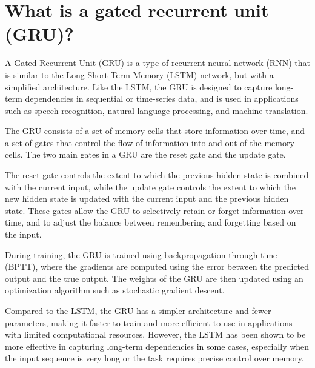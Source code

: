 \section{What is a gated recurrent unit (GRU)?}
A Gated Recurrent Unit (GRU) is a type of recurrent neural network (RNN) that is similar to the Long Short-Term Memory (LSTM) network, but with a simplified architecture. Like the LSTM, the GRU is designed to capture long-term dependencies in sequential or time-series data, and is used in applications such as speech recognition, natural language processing, and machine translation.

The GRU consists of a set of memory cells that store information over time, and a set of gates that control the flow of information into and out of the memory cells. The two main gates in a GRU are the reset gate and the update gate.

The reset gate controls the extent to which the previous hidden state is combined with the current input, while the update gate controls the extent to which the new hidden state is updated with the current input and the previous hidden state. These gates allow the GRU to selectively retain or forget information over time, and to adjust the balance between remembering and forgetting based on the input.

During training, the GRU is trained using backpropagation through time (BPTT), where the gradients are computed using the error between the predicted output and the true output. The weights of the GRU are then updated using an optimization algorithm such as stochastic gradient descent.

Compared to the LSTM, the GRU has a simpler architecture and fewer parameters, making it faster to train and more efficient to use in applications with limited computational resources. However, the LSTM has been shown to be more effective in capturing long-term dependencies in some cases, especially when the input sequence is very long or the task requires precise control over memory.

